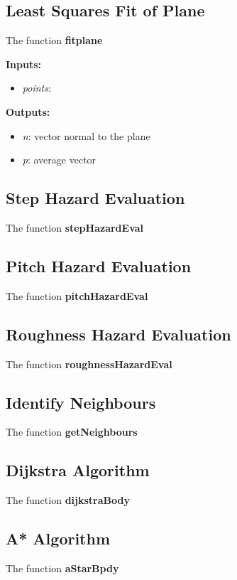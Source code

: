 \documentclass[Space3_Assign3.tex]{subfile}
\begin{document}
\subsection{Least Squares Fit of Plane}
The function \textbf{fitplane} 

\textbf{Inputs:}
\begin{itemize}
\item \textit{points}: 
\end{itemize}
\textbf{Outputs:}
\begin{itemize}
\item \textit{n}: vector normal to the plane
\item \textit{p}: average vector
\end{itemize}

\subsection{Step Hazard Evaluation}
The function \textbf{stepHazardEval}


\subsection{Pitch Hazard Evaluation}
The function \textbf{pitchHazardEval}


\subsection{Roughness Hazard Evaluation}
The function \textbf{roughnessHazardEval}


\subsection{Identify Neighbours}
The function \textbf{getNeighbours}




\subsection{Dijkstra Algorithm}
The function \textbf{dijkstraBody}



\subsection{A* Algorithm}
The function \textbf{aStarBpdy}
\end{document}
